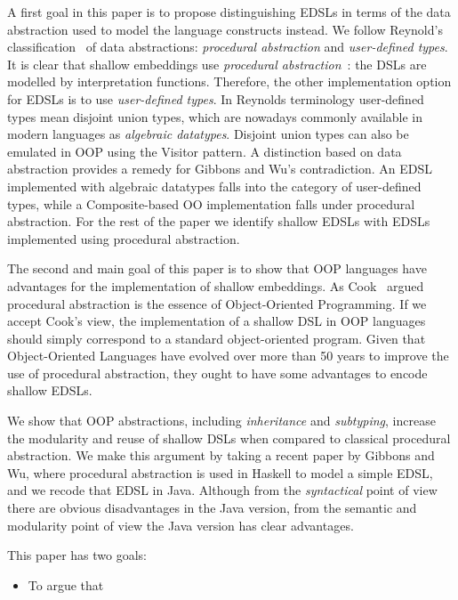 A first goal in this paper is to propose distinguishing EDSLs in terms of the data
abstraction used to model the language constructs instead.  We follow
Reynold's classification~\cite{} of data abstractions:
\emph{procedural abstraction} and \emph{user-defined types}. It is
clear that shallow embeddings use \emph{procedural
  abstraction}~\cite{}: the DSLs are modelled by interpretation
functions. Therefore, the other implementation option for EDSLs is to use
\emph{user-defined types}. In Reynolds terminology user-defined types
mean disjoint union types, which are nowadays commonly available in
modern languages as \emph{algebraic datatypes}. Disjoint union types 
can also be emulated in OOP using the {\sc Visitor} pattern. A
distinction based on data abstraction provides a remedy for Gibbons 
and Wu's contradiction. An EDSL implemented with algebraic
datatypes falls into the category of user-defined types, 
while a Composite-based OO implementation falls under procedural
abstraction. For the rest of the paper we identify shallow EDSLs 
with EDSLs implemented using procedural abstraction.

The second and main goal of this paper is to show that OOP languages have
advantages for the implementation of shallow embeddings.
As Cook~\cite{} argued procedural abstraction is the essence of
Object-Oriented Programming. If we accept Cook's view, the
implementation of a shallow DSL in OOP languages should simply
correspond to a standard object-oriented program. Given
that Object-Oriented Languages have evolved over more than 50 years 
to improve the use of procedural abstraction, they ought to have some 
advantages to encode shallow EDSLs. 

We show that OOP abstractions, including \emph{inheritance}
and \emph{subtyping}, increase the modularity and reuse of shallow
DSLs when compared to classical procedural abstraction. We make this
argument by taking a recent paper by Gibbons and Wu, where procedural
abstraction is used in Haskell to model a simple EDSL, and we recode
that EDSL in Java. Although from the \emph{syntactical} point of view
there are obvious disadvantages in the Java version, from the semantic
and modularity point of view the Java version has clear advantages.


This paper has two goals:

\begin{itemize}

\item To argue that 

\end{itemize} 